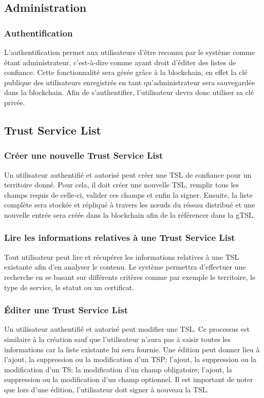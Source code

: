 \documentclass{tnreport}
\begin{document}
\subsection{Administration}
\subsubsection{Authentification}
L'authentification permet aux utilisateurs d'être reconnu par le système comme étant administrateur, c'est-à-dire comme ayant droit d'éditer des listes de confiance. Cette fonctionnalité sera gérée grâce à la blockchain, en effet la clé publique des utilisateurs enregistrés en tant qu'administrateur sera sauvegardée dans la blockchain. Afin de s'authentifier, l'utilisateur devra donc utiliser sa clé privée.

\subsection{Trust Service List}
\subsubsection{Créer une nouvelle Trust Service List}
Un utilisateur authentifié et autorisé peut créer une TSL de confiance pour un territoire donné. Pour cela, il doit créer une nouvelle TSL, remplir tous les champs requis de celle-ci, valider ces champs et enfin la signer. Ensuite, la liste complète sera stockée et répliqué à travers les nœuds du réseau distribué et une nouvelle entrée sera créée dans la blockchain afin de la référencer dans la gTSL.
\subsubsection{Lire les informations relatives à une Trust Service List}
Tout utilisateur peut lire et récupérer les informations relatives à une TSL existante afin d'en analyser le contenu. Le système permettra d'effectuer une recherche en se basant sur différents critères comme par exemple le territoire, le type de service, le statut ou un certificat.
\subsubsection{Éditer une Trust Service List}
Un utilisateur authentifié et autorisé peut modifier une TSL. Ce processus est similaire à la création sauf que l'utilisateur n'aura pas à saisir toutes les informations car la liste existante lui sera fournie. Une édition peut donner lieu à l'ajout, la suppression ou la modification d'un TSP; l'ajout, la suppression ou la modification d'un TS; la modification d'un champ obligatoire; l'ajout, la suppression ou la modification d'un champ optionnel. Il est important de noter que lors d'une édition, l'utilisateur doit signer à nouveau la TSL.
\end{document}

